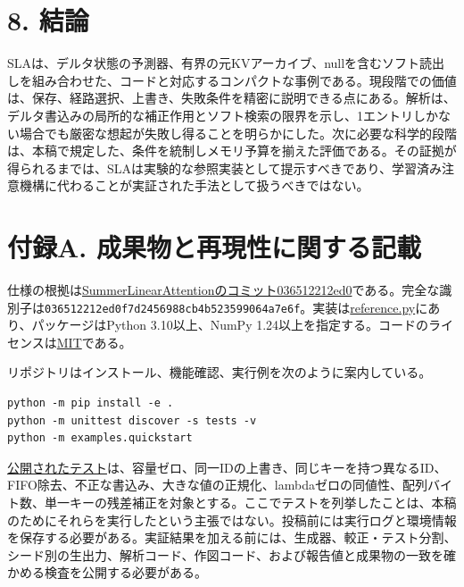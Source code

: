 \documentclass[11pt,a4paper]{article}
\begin{document}
\section{8. 結論}\label{ux7d50ux8ad6}

SLAは、デルタ状態の予測器、有界の元KVアーカイブ、nullを含むソフト読出しを組み合わせた、コードと対応するコンパクトな事例である。現段階での価値は、保存、経路選択、上書き、失敗条件を精密に説明できる点にある。解析は、デルタ書込みの局所的な補正作用とソフト検索の限界を示し、1エントリしかない場合でも厳密な想起が失敗し得ることを明らかにした。次に必要な科学的段階は、本稿で規定した、条件を統制しメモリ予算を揃えた評価である。その証拠が得られるまでは、SLAは実験的な参照実装として提示すべきであり、学習済み注意機構に代わることが実証された手法として扱うべきではない。

\section{付録A. 成果物と再現性に関する記載}\label{ux4ed8ux9332a.-ux6210ux679cux7269ux3068ux518dux73feux6027ux306bux95a2ux3059ux308bux8a18ux8f09}

仕様の根拠は\href{https://github.com/Summer110622/SummerLinearAttention/tree/036512212ed0f7d2456988cb4b523599064a7e6f}{SummerLinearAttentionのコミット036512212ed0}である。完全な識別子は\texttt{\nolinkurl{036512212ed0f7d2456988cb4b523599064a7e6f}}。実装は\href{https://github.com/Summer110622/SummerLinearAttention/blob/036512212ed0f7d2456988cb4b523599064a7e6f/summer_linear_attention/reference.py}{reference.py}にあり、パッケージはPython 3.10以上、NumPy 1.24以上を指定する。コードのライセンスは\href{https://github.com/Summer110622/SummerLinearAttention/blob/036512212ed0f7d2456988cb4b523599064a7e6f/LICENSE}{MIT}である。

リポジトリはインストール、機能確認、実行例を次のように案内している。

\begin{minipage}{\linewidth}

\begin{verbatim}
python -m pip install -e .
python -m unittest discover -s tests -v
python -m examples.quickstart
\end{verbatim}

\end{minipage}

\href{https://github.com/Summer110622/SummerLinearAttention/blob/036512212ed0f7d2456988cb4b523599064a7e6f/tests/test_reference.py}{公開されたテスト}は、容量ゼロ、同一IDの上書き、同じキーを持つ異なるID、FIFO除去、不正な書込み、大きな値の正規化、lambdaゼロの同値性、配列バイト数、単一キーの残差補正を対象とする。ここでテストを列挙したことは、本稿のためにそれらを実行したという主張ではない。投稿前には実行ログと環境情報を保存する必要がある。実証結果を加える前には、生成器、較正・テスト分割、シード別の生出力、解析コード、作図コード、および報告値と成果物の一致を確かめる検査を公開する必要がある。
\end{document}
